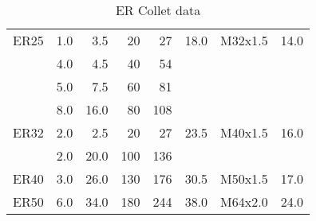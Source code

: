 \begin{table}[h]
\begin{tabular}{@{}l|r@{ - }rrrrlr}
    ER25
        &1.0&3.5
        & 20 & 27
        &18.0
        &M32x1.5
        &14.0
        \\

        &4.0&4.5
        & 40 & 54
        &
        & %
        & %
        \\

        &5.0&7.5
        & 60 & 81
        &
        & %
        & %
        \\

        &8.0&16.0&
        80 &108
        &
        & %
        & %
        \\

    ER32
        &2.0&2.5
        &20 & 27
        &23.5
        &M40x1.5
        &16.0
        \\

        &2.0&20.0
        &100 &136
        &
        & %
        & %
        \\

    ER40
        &3.0&26.0
        &130 &176
        &30.5
        &M50x1.5
        &17.0
        \\

    ER50
        &6.0&34.0
        &180 &244
        &38.0
        &M64x2.0
        &24.0
        \\

\end{tabular}
\caption{ER Collet data}
\end{table}
